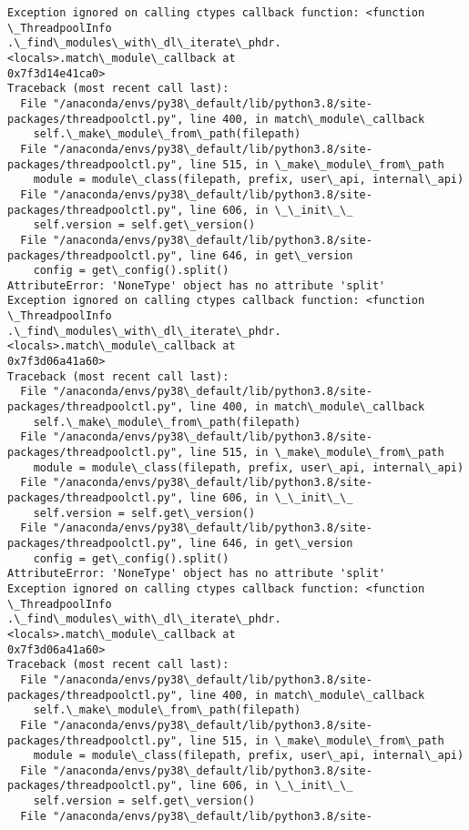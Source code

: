 \documentclass[11pt]{article}
\begin{document}
\begin{Verbatim}[commandchars=\\\{\}]
Exception ignored on calling ctypes callback function: <function \_ThreadpoolInfo
.\_find\_modules\_with\_dl\_iterate\_phdr.<locals>.match\_module\_callback at
0x7f3d14e41ca0>
Traceback (most recent call last):
  File "/anaconda/envs/py38\_default/lib/python3.8/site-
packages/threadpoolctl.py", line 400, in match\_module\_callback
    self.\_make\_module\_from\_path(filepath)
  File "/anaconda/envs/py38\_default/lib/python3.8/site-
packages/threadpoolctl.py", line 515, in \_make\_module\_from\_path
    module = module\_class(filepath, prefix, user\_api, internal\_api)
  File "/anaconda/envs/py38\_default/lib/python3.8/site-
packages/threadpoolctl.py", line 606, in \_\_init\_\_
    self.version = self.get\_version()
  File "/anaconda/envs/py38\_default/lib/python3.8/site-
packages/threadpoolctl.py", line 646, in get\_version
    config = get\_config().split()
AttributeError: 'NoneType' object has no attribute 'split'
Exception ignored on calling ctypes callback function: <function \_ThreadpoolInfo
.\_find\_modules\_with\_dl\_iterate\_phdr.<locals>.match\_module\_callback at
0x7f3d06a41a60>
Traceback (most recent call last):
  File "/anaconda/envs/py38\_default/lib/python3.8/site-
packages/threadpoolctl.py", line 400, in match\_module\_callback
    self.\_make\_module\_from\_path(filepath)
  File "/anaconda/envs/py38\_default/lib/python3.8/site-
packages/threadpoolctl.py", line 515, in \_make\_module\_from\_path
    module = module\_class(filepath, prefix, user\_api, internal\_api)
  File "/anaconda/envs/py38\_default/lib/python3.8/site-
packages/threadpoolctl.py", line 606, in \_\_init\_\_
    self.version = self.get\_version()
  File "/anaconda/envs/py38\_default/lib/python3.8/site-
packages/threadpoolctl.py", line 646, in get\_version
    config = get\_config().split()
AttributeError: 'NoneType' object has no attribute 'split'
Exception ignored on calling ctypes callback function: <function \_ThreadpoolInfo
.\_find\_modules\_with\_dl\_iterate\_phdr.<locals>.match\_module\_callback at
0x7f3d06a41a60>
Traceback (most recent call last):
  File "/anaconda/envs/py38\_default/lib/python3.8/site-
packages/threadpoolctl.py", line 400, in match\_module\_callback
    self.\_make\_module\_from\_path(filepath)
  File "/anaconda/envs/py38\_default/lib/python3.8/site-
packages/threadpoolctl.py", line 515, in \_make\_module\_from\_path
    module = module\_class(filepath, prefix, user\_api, internal\_api)
  File "/anaconda/envs/py38\_default/lib/python3.8/site-
packages/threadpoolctl.py", line 606, in \_\_init\_\_
    self.version = self.get\_version()
  File "/anaconda/envs/py38\_default/lib/python3.8/site-

\end{Verbatim}
\end{document}
